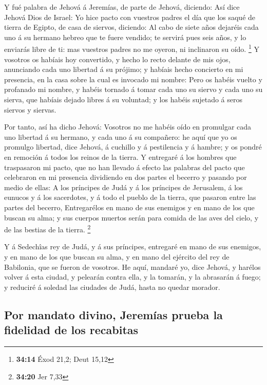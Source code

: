  Y fué palabra de Jehová á Jeremías, de parte de Jehová,
diciendo:  Así dice Jehová Dios de Israel: Yo hice pacto
con vuestros padres el día que los saqué de tierra de Egipto, de casa de
siervos, diciendo:  Al cabo de siete años dejaréis cada uno
á su hermano hebreo que te fuere vendido; te servirá pues seis años, y
lo enviarás libre de ti: mas vuestros padres no me oyeron, ni inclinaron
su oído. \footnote{\textbf{34:14} Éxod 21,2; Deut 15,12}  Y
vosotros os habíais hoy convertido, y hecho lo recto delante de mis
ojos, anunciando cada uno libertad á su prójimo; y habíais hecho
concierto en mi presencia, en la casa sobre la cual es invocado mi
nombre:  Pero os habéis vuelto y profanado mi nombre, y
habéis tornado á tomar cada uno su siervo y cada uno su sierva, que
habíais dejado libres á su voluntad; y los habéis sujetado á seros
siervos y siervas.

 Por tanto, así ha dicho Jehová: Vosotros no me habéis oído
en promulgar cada uno libertad á su hermano, y cada uno á su compañero:
he aquí que yo os promulgo libertad, dice Jehová, á cuchillo y á
pestilencia y á hambre; y os pondré en remoción á todos los reinos de la
tierra.  Y entregaré á los hombres que traspasaron mi
pacto, que no han llevado á efecto las palabras del pacto que celebraron
en mi presencia dividiendo en dos partes el becerro y pasando por medio
de ellas:  A los príncipes de Judá y á los príncipes de
Jerusalem, á los eunucos y á los sacerdotes, y á todo el pueblo de la
tierra, que pasaron entre las partes del becerro, 
Entregarélos en mano de sus enemigos y en mano de los que buscan su
alma; y sus cuerpos muertos serán para comida de las aves del cielo, y
de las bestias de la tierra. \footnote{\textbf{34:20} Jer 7,33}

 Y á Sedechîas rey de Judá, y á sus príncipes, entregaré en
mano de sus enemigos, y en mano de los que buscan su alma, y en mano del
ejército del rey de Babilonia, que se fueron de vosotros. 
He aquí, mandaré yo, dice Jehová, y harélos volver á esta ciudad, y
pelearán contra ella, y la tomarán, y la abrasarán á fuego; y reduciré á
soledad las ciudades de Judá, hasta no quedar morador.

\hypertarget{por-mandato-divino-jeremuxedas-prueba-la-fidelidad-de-los-recabitas}{%
\subsection{Por mandato divino, Jeremías prueba la fidelidad de los
recabitas}\label{por-mandato-divino-jeremuxedas-prueba-la-fidelidad-de-los-recabitas}}

